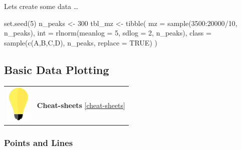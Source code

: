 \documentclass[
]{book}
\newenvironment{Shaded}{\begin{snugshade}}{\end{snugshade}}
\newcommand{\AttributeTok}[1]{\textcolor[rgb]{0.77,0.63,0.00}{#1}}
\newcommand{\ConstantTok}[1]{\textcolor[rgb]{0.00,0.00,0.00}{#1}}
\newcommand{\DecValTok}[1]{\textcolor[rgb]{0.00,0.00,0.81}{#1}}
\newcommand{\FunctionTok}[1]{\textcolor[rgb]{0.00,0.00,0.00}{#1}}
\newcommand{\NormalTok}[1]{#1}
\newcommand{\OtherTok}[1]{\textcolor[rgb]{0.56,0.35,0.01}{#1}}
\newcommand{\SpecialCharTok}[1]{\textcolor[rgb]{0.00,0.00,0.00}{#1}}
\newcommand{\StringTok}[1]{\textcolor[rgb]{0.31,0.60,0.02}{#1}}
\begin{document}
Lets create some data \ldots{}

\begin{Shaded}
\begin{Highlighting}[]
\FunctionTok{set.seed}\NormalTok{(}\DecValTok{5}\NormalTok{)}
\NormalTok{n\_peaks }\OtherTok{\textless{}{-}} \DecValTok{300}
\NormalTok{tbl\_mz }\OtherTok{\textless{}{-}} \FunctionTok{tibble}\NormalTok{(}
  \AttributeTok{mz =} \FunctionTok{sample}\NormalTok{(}\DecValTok{3500}\SpecialCharTok{:}\DecValTok{20000}\SpecialCharTok{/}\DecValTok{10}\NormalTok{, n\_peaks),}
  \AttributeTok{int =} \FunctionTok{rlnorm}\NormalTok{(}\AttributeTok{meanlog =} \DecValTok{5}\NormalTok{, }\AttributeTok{sdlog =} \DecValTok{2}\NormalTok{, n\_peaks),}
  \AttributeTok{class =} \FunctionTok{sample}\NormalTok{(}\FunctionTok{c}\NormalTok{(}\StringTok{\textquotesingle{}A\textquotesingle{}}\NormalTok{,}\StringTok{\textquotesingle{}B\textquotesingle{}}\NormalTok{,}\StringTok{\textquotesingle{}C\textquotesingle{}}\NormalTok{,}\StringTok{\textquotesingle{}D\textquotesingle{}}\NormalTok{), n\_peaks, }\AttributeTok{replace =} \ConstantTok{TRUE}\NormalTok{) }
\NormalTok{)}
\end{Highlighting}
\end{Shaded}

\hypertarget{basic-data-plotting}{%
\subsection{Basic Data Plotting}\label{basic-data-plotting}}

\hfill\break

\begin{longtable}[]{@{}
  >{\raggedright\arraybackslash}p{}
  >{\raggedright\arraybackslash}p{}@{}}
\toprule\noalign{}
\endhead
\bottomrule\noalign{}
\endlastfoot
\includegraphics[width=\textwidth,height=0.70833in]{images/01.png} & \textbf{Cheat-sheets} \ref{cheat-sheets} \\
\end{longtable}

\hfill\break

\hypertarget{points-and-lines}{%
\subsubsection*{Points and Lines}\label{points-and-lines}}
\end{document}
